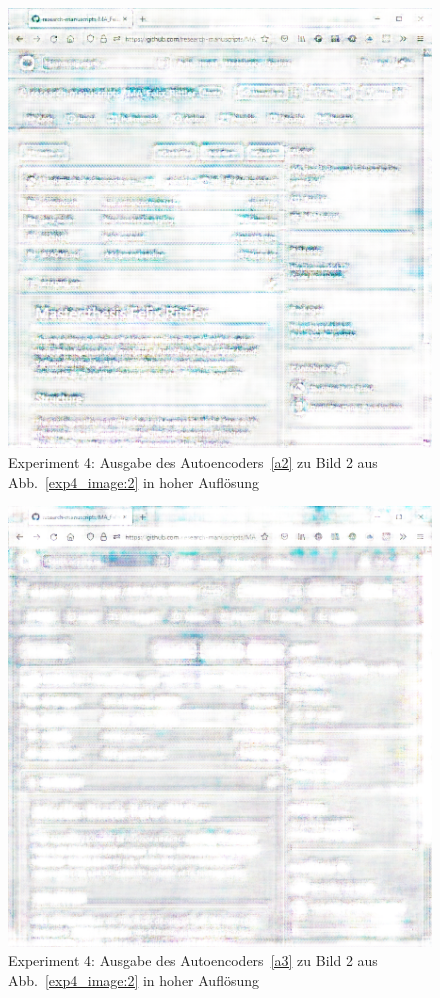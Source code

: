 \begin{figure} [ht]
  \centering
  \includegraphics[width=\textwidth]{bilder/result_exp4/4_pred_a2.png}

  \caption{Experiment 4: Ausgabe des Autoencoders~\ref{a2} zu Bild 2 aus Abb.~\ref{exp4_image:2} in hoher Auflösung}
\end{figure}

\begin{figure} [ht]
  \centering
  \includegraphics[width=\textwidth]{bilder/result_exp4/4_pred_a3.png}

  \caption{Experiment 4: Ausgabe des Autoencoders~\ref{a3} zu Bild 2 aus Abb.~\ref{exp4_image:2} in hoher Auflösung}
\end{figure}

